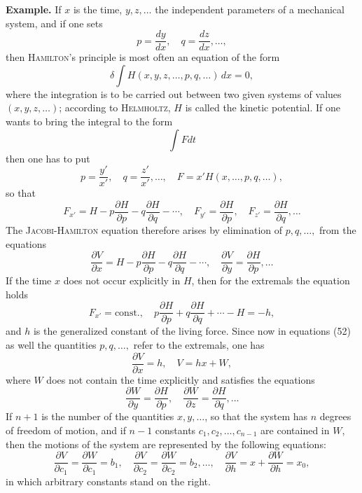 \documentclass[11pt,a4paper,leqno]{article}
\begin{document}
\bigskip

\noindent\textbf{Example.} If $x$ is the time, $y,z,\ldots$ the independent parameters of a mechanical system, and if one sets
\[
p=\frac{dy}{dx},\quad q=\frac{dz}{dx},\ldots,
\]
then \textsc{Hamilton}'s principle is most often an equation of the form
\[
\delta\int H(x,y,z,\ldots,p,q,\ldots)\,dx=0,
\]
where the integration is to be carried out between two given systems of values $(x,y,z,\ldots)$; according to \textsc{Helmholtz}, $H$ is called the kinetic potential. If one wants to bring the integral to the form
\[
\int Fdt
\]
then one has to put
\[
p=\frac{y'}{x'},\quad q=\frac{z'}{x'},\ldots,\quad
F=x'H(x,\ldots,p,q,\ldots),
\]
so that
\[
F_{x'}=H-p\frac{\partial H}{\partial p}-q\frac{\partial H}{\partial q}-\cdots,\quad
F_{y'}=\frac{\partial H}{\partial p},\quad
F_{z'}=\frac{\partial H}{\partial q},\ldots
\]
The \textsc{Jacobi-Hamilton} equation therefore arises by elimination of $p,q,\ldots,$ from the equations
\begin{equation}\tag{52}
\frac{\partial V}{\partial x}
=
H-p\frac{\partial H}{\partial p}
-q\frac{\partial H}{\partial q}-\cdots,\quad
\frac{\partial V}{\partial y}
=
\frac{\partial H}{\partial p},\ldots
\end{equation}
If the time $x$ does not occur explicitly in $H$, then for the extremals the equation holds
\begin{equation}\tag{53}
F_{x'}=\text{const.},\quad
p\frac{\partial H}{\partial p}
+
q\frac{\partial H}{\partial q}
+\cdots-H=-h,
\end{equation}
and $h$ is the generalized constant of the living force. Since now in equations (52) as well the quantities $p,q,\ldots,$ refer to the extremals, one has
\[
\frac{\partial V}{\partial x}=h,\quad V=hx+W,
\]
where $W$ does not contain the time explicitly and satisfies the equations
\[
\frac{\partial W}{\partial y}
=
\frac{\partial H}{\partial p},\quad
\frac{\partial W}{\partial z}
=
\frac{\partial H}{\partial q},\ldots
\]
If $n+1$ is the number of the quantities $x,y,\ldots$, so that the system has $n$ degrees of freedom of motion, and if $n-1$ constants $c_1,c_2,\ldots,c_{n-1}$ are contained in $W$, then the motions of the system are represented by the following equations:
\[
\frac{\partial V}{\partial c_1}=\frac{\partial W}{\partial c_1}=b_1,\quad
\frac{\partial V}{\partial c_2}=\frac{\partial W}{\partial c_2}=b_2,\ldots,\quad
\frac{\partial V}{\partial h}=x+\frac{\partial W}{\partial h}=x_0,
\]
in which arbitrary constants stand on the right.
\end{document}
